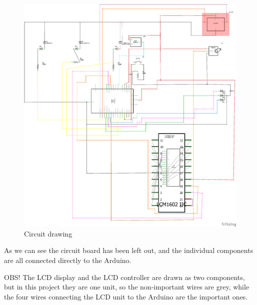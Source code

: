 \begin{figure} [h!]
\centering
  \includegraphics [width=\linewidth]{fig/Circuittekning}
  \caption{Circuit drawing}
  \label{fig:Circuitdrawing}
\end{figure}

As we can see the circuit board has been left out, and the individual components are all connected directly to the Arduino.  

OBS! The LCD display and the LCD controller are drawn as two components, but in this project they are one unit, so the non-important wires are grey, while the four wires connecting the LCD unit to the Arduino are the important ones. 